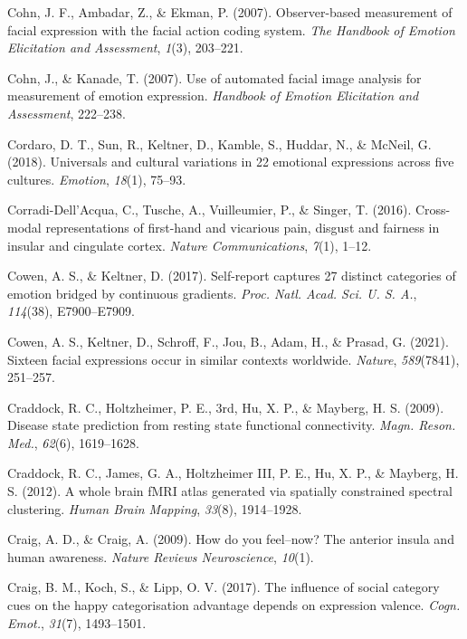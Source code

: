\documentclass[11pt,american,a4paper,oneside,]{memoir} %
\begin{document}
\leavevmode\hypertarget{ref-Cohn2007-az}{}%
Cohn, J. F., Ambadar, Z., \& Ekman, P. (2007). Observer-based measurement of facial expression with the facial action coding system. \emph{The Handbook of Emotion Elicitation and Assessment}, \emph{1}(3), 203--221.

\leavevmode\hypertarget{ref-Cohn2007-xe}{}%
Cohn, J., \& Kanade, T. (2007). Use of automated facial image analysis for measurement of emotion expression. \emph{Handbook of Emotion Elicitation and Assessment}, 222--238.

\leavevmode\hypertarget{ref-Cordaro2018-xm}{}%
Cordaro, D. T., Sun, R., Keltner, D., Kamble, S., Huddar, N., \& McNeil, G. (2018). Universals and cultural variations in 22 emotional expressions across five cultures. \emph{Emotion}, \emph{18}(1), 75--93.

\leavevmode\hypertarget{ref-corradi2016cross}{}%
Corradi-Dell'Acqua, C., Tusche, A., Vuilleumier, P., \& Singer, T. (2016). Cross-modal representations of first-hand and vicarious pain, disgust and fairness in insular and cingulate cortex. \emph{Nature Communications}, \emph{7}(1), 1--12.

\leavevmode\hypertarget{ref-Cowen2017-vz}{}%
Cowen, A. S., \& Keltner, D. (2017). Self-report captures 27 distinct categories of emotion bridged by continuous gradients. \emph{Proc. Natl. Acad. Sci. U. S. A.}, \emph{114}(38), E7900--E7909.

\leavevmode\hypertarget{ref-Cowen2021-ld}{}%
Cowen, A. S., Keltner, D., Schroff, F., Jou, B., Adam, H., \& Prasad, G. (2021). Sixteen facial expressions occur in similar contexts worldwide. \emph{Nature}, \emph{589}(7841), 251--257.

\leavevmode\hypertarget{ref-Craddock2009-kz}{}%
Craddock, R. C., Holtzheimer, P. E., 3rd, Hu, X. P., \& Mayberg, H. S. (2009). Disease state prediction from resting state functional connectivity. \emph{Magn. Reson. Med.}, \emph{62}(6), 1619--1628.

\leavevmode\hypertarget{ref-craddock2012whole}{}%
Craddock, R. C., James, G. A., Holtzheimer III, P. E., Hu, X. P., \& Mayberg, H. S. (2012). A whole brain fMRI atlas generated via spatially constrained spectral clustering. \emph{Human Brain Mapping}, \emph{33}(8), 1914--1928.

\leavevmode\hypertarget{ref-craig2009you}{}%
Craig, A. D., \& Craig, A. (2009). How do you feel--now? The anterior insula and human awareness. \emph{Nature Reviews Neuroscience}, \emph{10}(1).

\leavevmode\hypertarget{ref-Craig2017-db}{}%
Craig, B. M., Koch, S., \& Lipp, O. V. (2017). The influence of social category cues on the happy categorisation advantage depends on expression valence. \emph{Cogn. Emot.}, \emph{31}(7), 1493--1501.
\end{document}
